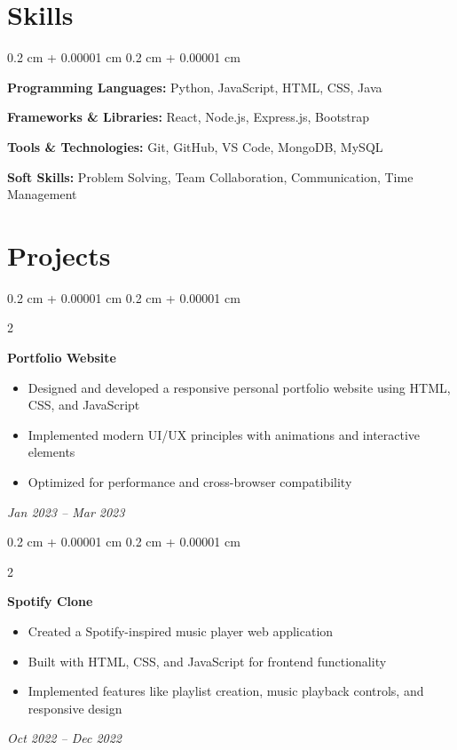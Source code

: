 \documentclass[10pt, letterpaper]{article}
\newenvironment{highlights}{ 
    \begin{itemize}[ 
        topsep=0.10 cm, 
        parsep=0.10 cm, 
        partopsep=0pt, 
        itemsep=0pt, 
        leftmargin=0.4 cm + 10pt 
    ] 
}{ 
    \end{itemize} 
} %
\newenvironment{onecolentry}{ 
    \begin{adjustwidth}{ 
        0.2 cm + 0.00001 cm 
    }{ 
        0.2 cm + 0.00001 cm 
    } 
}{ 
    \end{adjustwidth} 
} %
\newenvironment{twocolentry}[2][]{ 
    \onecolentry 
    \def\secondColumn{#2} 
    \setcolumnwidth{\fill, 4.5 cm} 
    \begin{paracol}{2} 
}{ 
    \switchcolumn \raggedleft \secondColumn 
    \end{paracol} 
    \endonecolentry 
} %
\begin{document}
    \section{Skills}
        \begin{onecolentry}
            \textbf{Programming Languages:} Python, JavaScript, HTML, CSS, Java
            
            \textbf{Frameworks \& Libraries:} React, Node.js, Express.js, Bootstrap
            
            \textbf{Tools \& Technologies:} Git, GitHub, VS Code, MongoDB, MySQL
            
            \textbf{Soft Skills:} Problem Solving, Team Collaboration, Communication, Time Management
        \end{onecolentry}

    \section{Projects}
        \begin{twocolentry}{
        \textit{Jan 2023 – Mar 2023}}
            \textbf{Portfolio Website}
            
            \begin{highlights}
                \item Designed and developed a responsive personal portfolio website using HTML, CSS, and JavaScript
                \item Implemented modern UI/UX principles with animations and interactive elements
                \item Optimized for performance and cross-browser compatibility
            \end{highlights}
        \end{twocolentry}
        
        \begin{twocolentry}{
        \textit{Oct 2022 – Dec 2022}}
            \textbf{Spotify Clone}
            
            \begin{highlights}
                \item Created a Spotify-inspired music player web application
                \item Built with HTML, CSS, and JavaScript for frontend functionality
                \item Implemented features like playlist creation, music playback controls, and responsive design
            \end{highlights}
        \end{twocolentry}
\end{document}
